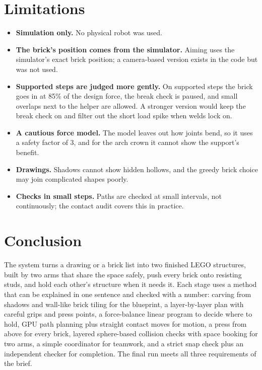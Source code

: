 \documentclass[11pt,a4paper]{article}
\begin{document}
\section{Limitations}\label{sec:limits}

\begin{itemize}
\item \textbf{Simulation only.} No physical robot was used.
\item \textbf{The brick's position comes from the simulator.} Aiming uses the simulator's
      exact brick position; a camera-based version exists in the code but was not used.
\item \textbf{Supported steps are judged more gently.} On supported steps the brick goes in
      at 85\% of the design force, the break check is paused, and small overlaps next to
      the helper are allowed. A stronger version would keep the break check on and
      filter out the short load spike when welds lock on.
\item \textbf{A cautious force model.} The model leaves out how joints bend, so it uses a
      safety factor of 3, and for the arch crown it cannot show the support's benefit.
\item \textbf{Drawings.} Shadows cannot show hidden hollows, and the greedy brick choice may
      join complicated shapes poorly.
\item \textbf{Checks in small steps.} Paths are checked at small intervals, not continuously;
      the contact audit covers this in practice.
\end{itemize}

\section{Conclusion}
The system turns a drawing or a brick list into two finished LEGO structures,
built by two arms that share the space safely, push every brick onto
resisting studs, and hold each other's structure when it needs it. Each stage
uses a method that can be explained in one sentence and checked with a
number: carving from shadows and wall-like brick tiling for the blueprint, a
layer-by-layer plan with careful grips and press points, a force-balance linear
program to decide where to hold, GPU path planning plus straight contact moves
for motion, a press from above for every brick, layered sphere-based collision
checks with space booking for two arms, a simple coordinator for teamwork, and
a strict snap check plus an independent checker for completion. The final run
meets all three requirements of the brief.
\end{document}

